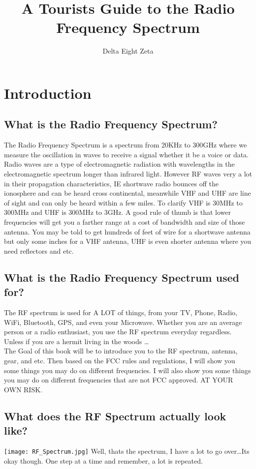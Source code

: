 \documentclass{book}
\title{A Tourists Guide to the Radio Frequency Spectrum}
\author{Delta Eight Zeta}
\begin{document}
    \maketitle
    \tableofcontents


    \chapter{Introduction}
    \section{What is the Radio Frequency Spectrum?}
        The Radio Frequency Spectrum is a spectrum from 20KHz to 300GHz where we measure the oscillation in waves to receive a signal whether it be a voice or data.
        Radio waves are a type of electromagnetic radiation with wavelengths in the electromagnetic spectrum longer than infrared light. 
        However RF waves very a lot in their propagation characteristics, IE shortwave radio bounces off the ionosphere and can be heard cross continental,
        meanwhile VHF and UHF are line of sight and can only be heard within a few miles.
        To clarify VHF is 30MHz to 300MHz and UHF is 300MHz to 3GHz. A good rule of thumb is that lower frequencies will get you a farther range at a cost
        of bandwidth and size of those antenna. You may be told to get hundreds of feet of wire for a shortwave antenna but only some inches for a VHF antenna,
        UHF is even shorter antenna where you need reflectors and etc.
    \section{What is the Radio Frequency Spectrum used for?}
        The RF spectrum is used for A LOT of things, from your TV, Phone, Radio, WiFi, Bluetooth, GPS, and even your Microwave.
        Whether you are an average person or a radio enthusiast, you use the RF spectrum everyday regardless. Unless if you are a 
        hermit living in the woods \ldots
        \\
        The Goal of this book will be to introduce you to the RF spectrum, antenna, gear, and etc.
        Then based on the FCC rules and regulations, I will show you some things you may do on different frequencies.
        I will also show you some things you may do on different frequencies that are not FCC approved. AT YOUR OWN RISK.
    \section{What does the RF Spectrum actually look like?}
    \texttt{[image: RF\_Spectrum.jpg]}
        Well, thats the spectrum, I have a lot to go over\ldots Its okay though.
        One step at a time and remember, a lot is repeated.
\end{document}
